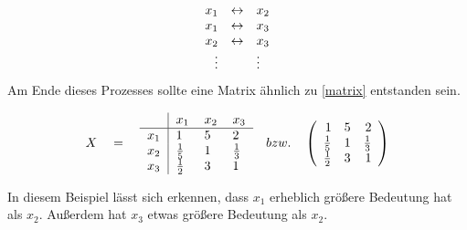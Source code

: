 \[\begin{array}{rcl}
		\centering
	  x_1 &\leftrightarrow &x_2 \\
	  x_1 &\leftrightarrow &x_3 \\
	  x_2 &\leftrightarrow &x_3 \\
   \vdots &                &\vdots
\end{array}\]
Am Ende dieses Prozesses sollte eine Matrix ähnlich zu \ref{matrix} entstanden sein.
\begin{table}[h!]
    \centering
\[X\quad = \quad\begin{tabular}{l|llll}
		& $x_1$ & $x_2$ &  $x_3$  \\ \hline
  $x_1$ &   1   &   5   &   2   \\
  $x_2$	&$\frac{1}{5}$&   1   &$\frac{1}{3}$     \\
  $x_3$	&$\frac{1}{2}$&   3   &   1         
   	  \end{tabular} 	  
\quad bzw. \quad
\left( \begin{array}{rrrr}
 1   &   5   &   2   \\
\frac{1}{5}&   1   &\frac{1}{3}     \\
\frac{1}{2}&   3   &   1        
\end{array}\right) 
\]
\caption{Matrix}
\label{matrix}
\end{table}
In diesem Beispiel lässt sich erkennen, dass $x_1$ erheblich größere Bedeutung hat als $x_2$. Außerdem hat $x_3$ etwas größere Bedeutung als $x_2$.
